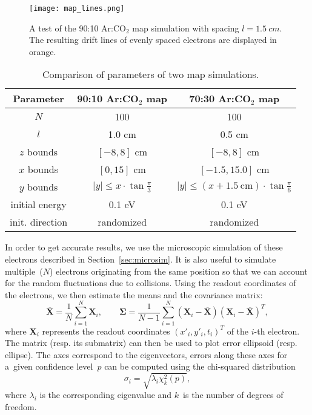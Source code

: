 		\begin{figure}
			\centering
			\texttt{[image: map\_lines.png]}
			\caption{A test of the 90:10 Ar:CO$_2$ map simulation with spacing $l = \qty{1.5}{cm}$. The resulting drift lines of evenly spaced electrons are displayed in orange.}
			\label{fig:maplines}
		\end{figure}
		
		\begin{table}
			\centering
			\caption{Comparison of parameters of two map simulations.}
			{\renewcommand{\arraystretch}{1.2}
			\begin{tabular}{|c|c|c|}
				\hline
				\textbf{Parameter} & \textbf{90:10 Ar:CO$_2$ map} & \textbf{70:30 Ar:CO$_2$ map}\\
				\hline
				$N$ & 100 & 100 \\
				\hline
				$l$ & 1.0 cm & 0.5 cm \\
				\hline
				$z$ bounds & $[-8,8]$ cm & $[-8,8]$ cm \\
				\hline
				$x$ bounds & $[0,15]$ cm & $[-1.5,15.0]$ cm \\
				\hline
				$y$ bounds & $|y| \leq x\cdot\tan\frac{\pi}{3}$ & $|y| \leq (x+\qty{1.5}{\centi\meter})\cdot\tan\frac{\pi}{6}$ \\
				\hline
				initial energy & 0.1 eV & 0.1 eV \\
				\hline
				init. direction & randomized & randomized \\
				\hline
			\end{tabular}}
			\label{tab:map}
		\end{table}
		
		In order to get accurate results, we use the microscopic simulation of these electrons described in Section~\ref{sec:microsim}. It is also useful to simulate multiple~($N$) electrons originating from the same position so that we can account for the random fluctuations due to collisions. Using the readout coordinates of the electrons, we then estimate the means and the covariance matrix:
			\begin{equation}
				\label{eq:cov}
				\mathbf{\overline{X}} = \frac{1}{N}\sum_{i=1}^{N} \mathbf{X}_i,\qquad \mathbf{\Sigma} = \frac{1}{N-1}\sum_{i=1}^{N}(\mathbf{X}_i-\mathbf{\overline{X}})(\mathbf{X}_i-\mathbf{\overline{X}})^T,
			\end{equation}
		where $\mathbf{X}_i$ represents the readout coordinates $(x'_i, y'_i, t_i)^T$ of the $i$\nobreakdash-th electron. The matrix (resp. its submatrix) can then be used to plot error ellipsoid (resp. ellipse). The axes correspond to the eigenvectors, errors along these axes for a~given confidence level~$p$ can be computed using the chi\nobreakdash-squared distribution
			\begin{equation}
				\label{eq:sigma}
				\sigma_i = \sqrt{\lambda_i \chi^2_k(p)},
			\end{equation}
		where $\lambda_i$ is the corresponding eigenvalue and $k$~is the number of degrees of freedom.
		
